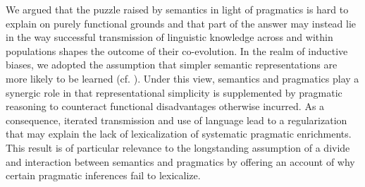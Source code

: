 \documentclass[a4paper, 11pt]{article}
\begin{document}
We argued that the puzzle raised by semantics in light of pragmatics is hard to explain on purely functional grounds and that part of the answer may instead lie in the way successful transmission of linguistic knowledge across and within populations shapes the outcome of their co-evolution. In the realm of inductive biases, we adopted the assumption that simpler semantic representations are more likely to be learned (cf. \citealt{chater+vitanyi:2003}). Under this view, semantics and pragmatics play a synergic role in that representational simplicity is supplemented by pragmatic reasoning to counteract functional disadvantages otherwise incurred. As a consequence, iterated transmission and use of language lead to a regularization that may explain the lack of lexicalization of systematic pragmatic enrichments. This result is of particular relevance to the longstanding assumption of a divide and interaction between semantics and pragmatics by offering an account of why certain pragmatic inferences fail to lexicalize. 
\end{document}
